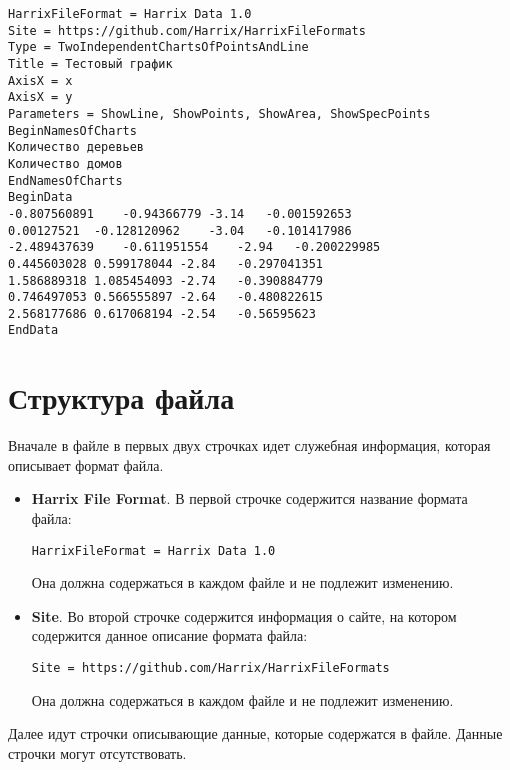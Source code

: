 \documentclass[a4paper,12pt]{article}
\begin{document}
\begin{lstlisting}[label=Example01,caption=Пример файла *.hdata]
HarrixFileFormat = Harrix Data 1.0
Site = https://github.com/Harrix/HarrixFileFormats
Type = TwoIndependentChartsOfPointsAndLine
Title = Тестовый график
AxisX = x
AxisX = y
Parameters = ShowLine, ShowPoints, ShowArea, ShowSpecPoints
BeginNamesOfCharts
Количество деревьев
Количество домов
EndNamesOfCharts
BeginData
-0.807560891	-0.94366779	-3.14	-0.001592653
0.00127521	-0.128120962	-3.04	-0.101417986
-2.489437639	-0.611951554	-2.94	-0.200229985
0.445603028	0.599178044	-2.84	-0.297041351
1.586889318	1.085454093	-2.74	-0.390884779
0.746497053	0.566555897	-2.64	-0.480822615
2.568177686	0.617068194	-2.54	-0.56595623
EndData
\end{lstlisting}

\section{Структура файла}

Вначале в файле в первых двух строчках идет служебная информация, которая описывает формат файла.

\begin{itemize}
\item \textbf{Harrix File Format}.
В первой строчке содержится название формата файла:
\begin{lstlisting}[label=Line01,caption=Первая строчка файла *.hdata]
HarrixFileFormat = Harrix Data 1.0
\end{lstlisting}
Она должна содержаться в каждом файле и не подлежит изменению.

\item \textbf{Site}.
Во второй строчке содержится информация о сайте, на котором содержится данное описание формата файла:
\begin{lstlisting}[label=Line02,caption=Вторая строчка файла *.hdata]
Site = https://github.com/Harrix/HarrixFileFormats
\end{lstlisting}
Она должна содержаться в каждом файле и не подлежит изменению.
\end{itemize}

Далее идут строчки описывающие данные, которые содержатся в файле. Данные строчки могут отсутствовать.
\end{document}
